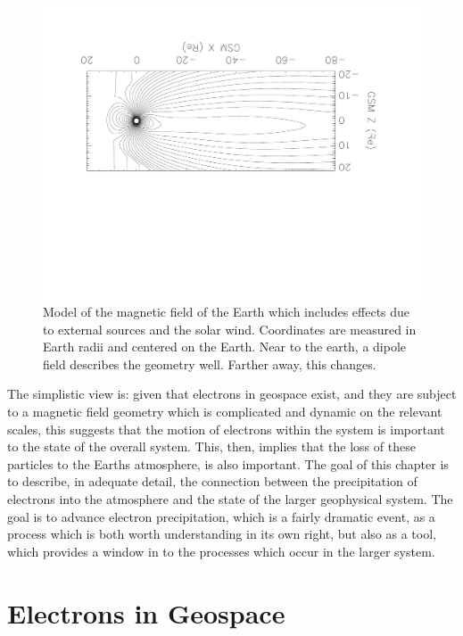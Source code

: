 \begin{figure}[p]
\label{magnetosphere_diagram}
\centering
\includegraphics[width=1.1\textwidth,angle=180]{figures/chapter_2/magnetosphere_diagram/magnetosphere_diagram}
\caption{Model of the magnetic field of the Earth which includes effects due to external sources and the solar wind. Coordinates are measured in Earth radii and centered on the Earth. Near to the earth, a dipole field describes the geometry well. Farther away, this changes. }
\end{figure}

The simplistic view is: given that electrons in geospace exist, and they are subject to a magnetic field geometry which is complicated and dynamic on the relevant scales, this suggests that the motion of electrons within the system is important to the state of the overall system. This, then, implies that the loss of these particles to the Earths atmosphere, is also important. The goal of this chapter is to describe, in adequate detail, the connection between the precipitation of electrons into the atmosphere and the state of the larger geophysical system. The goal is to advance electron precipitation, which is a fairly dramatic event, as a process which is both worth understanding in its own right, but also as a tool, which provides a window in to the processes which occur in the larger system. 

\section{Electrons in Geospace}

